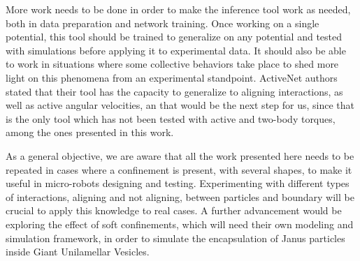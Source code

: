 \documentclass[../../master_thesis_np.tex]{subfiles}
\begin{document}
More work needs to be done in order to make the inference tool work as needed, both in data preparation and network training.
Once working on a single potential, this tool should be trained to generalize on any potential and tested with simulations before applying it to experimental data.
It should also be able to work in situations where some collective behaviors take place to shed more light on this phenomena from an experimental standpoint.
ActiveNet \cite{ruiz-garcia_discovering_2024} authors stated that their tool has the capacity to generalize to aligning interactions, as well as active angular velocities, an that would be the next step for us, since that is the only tool which has not been tested with active and two-body torques, among the ones presented in this work.

As a general objective, we are aware that all the work presented here needs to be repeated in cases where a confinement is present, with several shapes, to make it useful in micro-robots designing and testing.
Experimenting with different types of interactions, aligning and not aligning, between particles and boundary will be crucial to apply this knowledge to real cases.
A further advancement would be exploring the effect of soft confinements, which will need their own modeling and simulation framework, in order to simulate the encapsulation of Janus particles inside Giant Unilamellar Vesicles.
\end{document}
